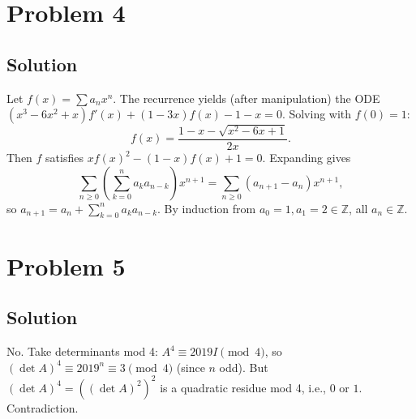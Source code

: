 \documentclass{article}
\begin{document}
\section*{Problem 4}
\subsection*{Solution}
Let $f(x) = \sum a_n x^n$. The recurrence yields (after manipulation) the ODE $(x^3 - 6x^2 + x) f'(x) + (1 - 3x) f(x) - 1 - x = 0$. Solving with $f(0) = 1$:
\[ f(x) = \frac{1 - x - \sqrt{x^2 - 6x + 1}}{2x}. \]
Then $f$ satisfies $x f(x)^2 - (1-x) f(x) + 1 = 0$. Expanding gives
\[ \sum_{n \geq 0} \left(\sum_{k=0}^n a_k a_{n-k}\right) x^{n+1} = \sum_{n \geq 0} (a_{n+1} - a_n) x^{n+1}, \]
so $a_{n+1} = a_n + \sum_{k=0}^n a_k a_{n-k}$. By induction from $a_0 = 1, a_1 = 2 \in \mathbb{Z}$, all $a_n \in \mathbb{Z}$.

\section*{Problem 5}
\subsection*{Solution}
No. Take determinants mod 4: $A^4 \equiv 2019 I \pmod 4$, so $(\det A)^4 \equiv 2019^n \equiv 3 \pmod 4$ (since $n$ odd). But $(\det A)^4 = ((\det A)^2)^2$ is a quadratic residue mod 4, i.e., $0$ or $1$. Contradiction.
\end{document}
